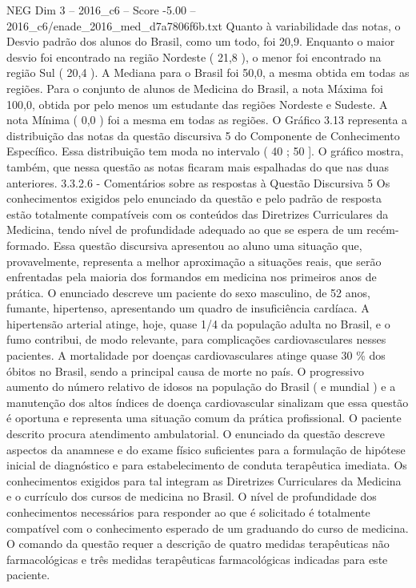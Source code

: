 \begin{textsample}{NEG Dim 3 – 2016\_c6 – Score -5.00 – 2016\_c6/enade\_2016\_med\_d7a7806f6b.txt}
Quanto à variabilidade das notas, o Desvio padrão dos alunos do Brasil, como um todo, foi 20,9.
Enquanto o maior desvio foi encontrado na região Nordeste ( 21,8 ), o menor foi encontrado na região Sul ( 20,4 ).
A Mediana para o Brasil foi 50,0, a mesma obtida em todas as regiões.
Para o conjunto de alunos de Medicina do Brasil, a nota Máxima foi 100,0, obtida por pelo menos um estudante das regiões Nordeste e Sudeste.
A nota Mínima ( 0,0 ) foi a mesma em todas as regiões.
O Gráfico 3.13 representa a distribuição das notas da questão discursiva 5 do Componente de Conhecimento Específico.
Essa distribuição tem moda no intervalo ( 40 ; 50 ].
O gráfico mostra, também, que nessa questão as notas ficaram mais espalhadas do que nas duas anteriores. 3.3.2.6 - Comentários sobre as respostas à Questão Discursiva 5 Os conhecimentos exigidos pelo enunciado da questão e pelo padrão de resposta estão totalmente compatíveis com os conteúdos das Diretrizes Curriculares da Medicina, tendo nível de profundidade adequado ao que se espera de um recém-formado.
Essa questão discursiva apresentou ao aluno uma situação que, provavelmente, representa a melhor aproximação a situações reais, que serão enfrentadas pela maioria dos formandos em medicina nos primeiros anos de prática.
O enunciado descreve um paciente do sexo masculino, de 52 anos, fumante, hipertenso, apresentando um quadro de insuficiência cardíaca.
A hipertensão arterial atinge, hoje, quase 1/4 da população adulta no Brasil, e o fumo contribui, de modo relevante, para complicações cardiovasculares nesses pacientes.
A mortalidade por doenças cardiovasculares atinge quase 30 \% dos óbitos no Brasil, sendo a principal causa de morte no país.
O progressivo aumento do número relativo de idosos na população do Brasil ( e mundial ) e a manutenção dos altos índices de doença cardiovascular sinalizam que essa questão é oportuna e representa uma situação comum da prática profissional.
O paciente descrito procura atendimento ambulatorial.
O enunciado da questão descreve aspectos da anamnese e do exame físico suficientes para a formulação de hipótese inicial de diagnóstico e para estabelecimento de conduta terapêutica imediata.
Os conhecimentos exigidos para tal integram as Diretrizes Curriculares da Medicina e o currículo dos cursos de medicina no Brasil.
O nível de profundidade dos conhecimentos necessários para responder ao que é solicitado é totalmente compatível com o conhecimento esperado de um graduando do curso de medicina.
O comando da questão requer a descrição de quatro medidas terapêuticas não farmacológicas e três medidas terapêuticas farmacológicas indicadas para este paciente.

\end{textsample}
